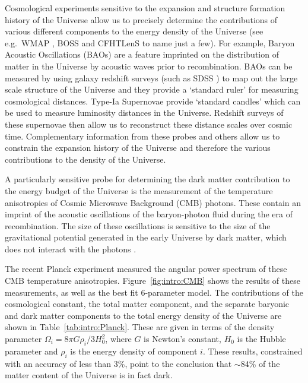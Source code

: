 Cosmological experiments sensitive to the expansion and structure formation history of the Universe allow us to precisely determine the contributions of various different components to the energy density of the Universe (see e.g.\  WMAP \cite{Hinshaw:2013}, BOSS \cite{Dawson:2013} and CFHTLenS \cite{Kitching:2014, Fu:2014} to name just a few). For example, Baryon Acoustic Oscillations (BAOs) \cite{Percival:2001} are a feature imprinted on the distribution of matter in the Universe by acoustic waves prior to recombination. BAOs can be measured by using galaxy redshift surveys (such as SDSS \cite{York:2000}) to map out the large scale structure of the Universe and they provide a `standard ruler' for measuring cosmological distances. Type-Ia Supernovae provide `standard candles' which can be used to measure luminosity distances in the Universe. Redshift surveys of these supernovae \cite{Suzuki:2011} then allow us to reconstruct these distance scales over cosmic time. Complementary information from these probes and others allow us to constrain the expansion history of the Universe and therefore the various contributions to the density of the Universe.





A particularly sensitive probe for determining the dark matter contribution to the energy budget of the Universe is the measurement of the temperature anisotropies of Cosmic Microwave Background (CMB) photons. These contain an imprint of the acoustic oscillations of the baryon-photon fluid during the era of recombination. The size of these oscillations is sensitive to the size of the gravitational potential generated in the early Universe by dark matter, which does not interact with the photons \cite{Kolb:1990}.

The recent Planck experiment \cite{PlanckI:2013} measured the angular power spectrum of these CMB temperature anisotropies. Figure~\ref{fig:intro:CMB} shows the results of these measurements, as well as the best fit 6-parameter \LCDM model. The contributions of the cosmological constant, the total matter component, and the separate baryonic and dark matter components to the total energy density of the Universe are shown in Table~\ref{tab:intro:Planck}. These are given in terms of the density parameter $\Omega_i = 8\pi G \rho_i/3 H_0^2$, where $G$ is Newton's constant, $H_0$ is the Hubble parameter and $\rho_i$ is the energy density of component $i$.  These results, constrained with an accuracy of less than 3\%, point to the conclusion that $\sim$84\% of the matter content of the Universe is in fact dark.

